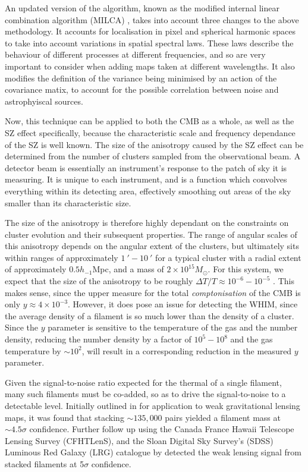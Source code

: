 An updated version of the algorithm, known as the modified internal linear combination algorithm (MILCA) \citep{2013A&A...558A.118H}, takes into account three changes to the above methodology. It accounts for localisation in pixel and spherical harmonic spaces to take into account variations in spatial spectral laws. These laws describe the behaviour of different processes at different frequencies, and so are very important to consider when adding maps taken at different wavelengths. It also modifies the definition of the variance being minimised by an action of the covariance matix, to account for the possible correlation between noise and astrophyiscal sources.

Now, this technique can be applied to both the CMB as a whole, as well as the SZ effect specifically, because the characteristic scale and frequency dependance of the SZ is well known.  The size of the anisotropy caused by the SZ effect can be determined from the number of clusters sampled from the observational beam. A detector beam is essentially an instrument's response to the patch of sky it is measuring. It is unique to each instrument, and is a function which convolves everything within its detecting area, effectively smoothing out areas of the sky smaller than its characteristic size.

\par The size of the anisotropy is therefore highly dependant on the constraints on cluster evolution and their subsequent properties. The range of angular scales of this anisotropy depends on the angular extent of the clusters, but ultimately sits within ranges of approximately $\SI{1}{\arcmin} - \SI{10}{\arcmin}$  for a typical cluster with a radial extent of approximately $0.5 h_{-1} $Mpc, and a mass of $2\times 10^{15} M_\odot$. For this system, we expect that the size of the anisotropy to be roughly $\Delta T/T \approx 10^{-6} - 10^{-5}$ \citep{1995ARA&A..33..541R}. This makes sense, since the upper measure for the total \emph{comptonisation} of the CMB is only $y \approx 4\times 10^{-3}$. However, it does pose an issue for detecting the WHIM, since the average density of a filament is so much lower than the density of a cluster. Since the $y$ parameter is sensitive to the temperature of the gas and the number density, reducing the number density by a factor of $10^5-10^8$ and the gas temperature by $\sim 10^2$, will result in a corresponding reduction in the measured $y$ parameter. 

Given the signal-to-noise ratio expected for the thermal \sze of a single filament, many such filaments must be co-added, so as to drive the signal-to-noise to a detectable level. Initially outlined in \cite{2016MNRAS.457.2391C} for application to weak gravitational lensing maps, it was found that stacking $\sim 135,000$ pairs yielded a filament mass at $\sim 4.5 \sigma$ confidence. Further follow up using the Canada France Hawaii Telescope Lensing Survey (CFHTLenS), and the Sloan Digital Sky Survey's (SDSS) Luminous Red Galaxy (LRG) catalogue by \cite{2017MNRAS.468.2605E} detected the weak lensing signal from stacked filaments at 5$\sigma$ confidence.

